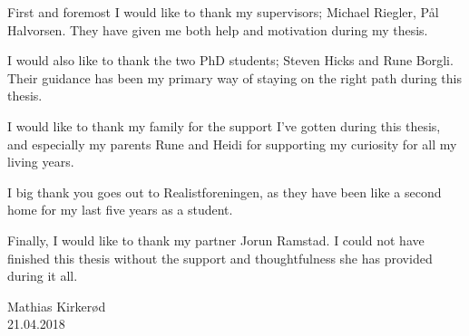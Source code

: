 First and foremost I would like to thank my supervisors; Michael Riegler, Pål Halvorsen. They have given me both help and motivation during my thesis.

I would also like to thank the two PhD students; Steven Hicks and Rune Borgli. Their guidance has been my primary way of staying on the right path during this thesis. 

I would like to thank my family for the support I've gotten during this thesis, and especially my parents Rune and Heidi for supporting my curiosity for all my living years. 

I big thank you goes out to Realistforeningen, as they have been like a second home for my last five years as a student.

Finally, I would like to thank my partner Jorun Ramstad. I could not have finished this thesis without the support and thoughtfulness she has provided during it all.

\vspace{10px}
Mathias Kirker{\o}d\\
21.04.2018




